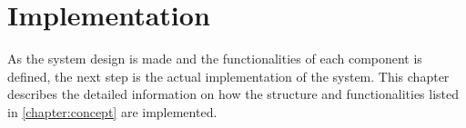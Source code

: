 \chapter{Implementation}

As the system design is made and the functionalities of each component is defined, the next step is the actual implementation of the system. This chapter describes the detailed information on how the structure and functionalities listed in \autoref{chapter:concept} are implemented.




